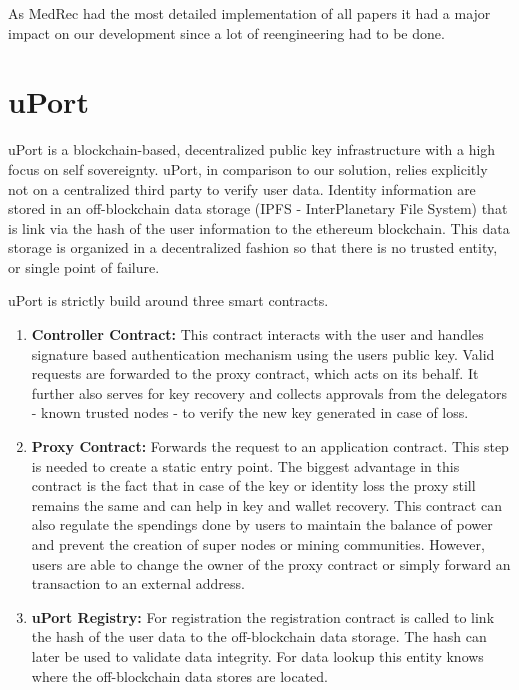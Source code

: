 As MedRec had the most detailed implementation of all papers it had a major impact on our development since
a lot of reengineering had to be done.

\section{uPort}
uPort is a blockchain-based, decentralized public key infrastructure with a high focus on self sovereignty. uPort, in comparison to our solution, relies explicitly not on a centralized third party to verify user data.\cite[p. 2]{uPortWhitePaper}
Identity information are stored in an off-blockchain data storage (IPFS - InterPlanetary File System) that is link via the hash of the user information to the ethereum blockchain. This data storage is organized in a decentralized fashion so that there is no trusted entity, or single point of failure. 

\noindent uPort is strictly build around three smart contracts.
\begin{enumerate}
\item \textbf{Controller Contract:} This contract interacts with the user and handles signature based authentication mechanism using the users public key. Valid requests are forwarded to the proxy contract, which acts on its behalf. 
It further also serves for key recovery and collects approvals from the delegators - known trusted nodes - to verify the new key generated in case of loss.

\item \textbf{Proxy Contract:}
Forwards the request to an application contract. This step is needed to create a static entry point.
The biggest advantage in this contract is the fact that in case of the key or identity loss the proxy still remains the same and can help in key and wallet recovery.
This contract can also regulate the spendings done by users to maintain the balance of power and prevent the creation of super nodes or mining communities.
However, users are able to change the owner of the proxy contract or simply forward an transaction to an external address\cite[p. 6]{uPortWhitePaper}.

\item \textbf{uPort Registry:}
For registration the registration contract is called to link the hash of the user data to the off-blockchain data storage. The hash can later be used to validate data integrity. 
For data lookup this entity knows where the off-blockchain data stores are located.

\end{enumerate}

